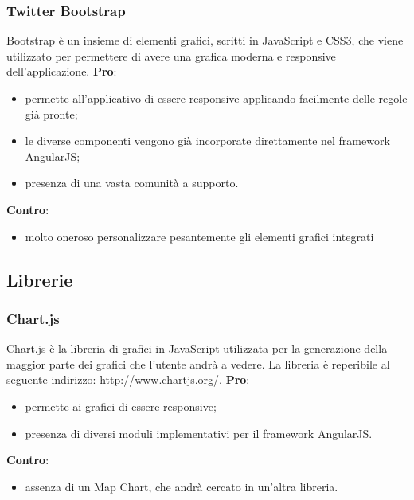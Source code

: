 		\subsubsection{Twitter Bootstrap} %
		\label{ssub:twitter_bootstrap}
		Bootstrap è un insieme di elementi grafici, scritti in JavaScript e CSS3, che viene utilizzato per permettere di avere una grafica moderna e responsive dell'applicazione. \newline
		\textbf{Pro}:
			\begin{itemize}
				\item permette all'applicativo di essere responsive applicando facilmente delle regole già pronte;
				\item le diverse componenti vengono già incorporate direttamente nel framework AngularJS;
				\item presenza di una vasta comunità a supporto.
			\end{itemize}
		\noindent
		\textbf{Contro}:
			\begin{itemize}
				\item molto oneroso personalizzare pesantemente gli elementi grafici integrati
			\end{itemize}


	\subsection{Librerie} %
	\label{sub:librerie}
		\subsubsection{Chart.js} %
		\label{ssub:chartsjs}
		Chart.js è la libreria di grafici in JavaScript utilizzata per la generazione della maggior parte dei grafici che l'utente andrà a vedere. La libreria è reperibile al seguente indirizzo: \url{http://www.chartjs.org/}. \newline
		\textbf{Pro}:
			\begin{itemize}
				\item permette ai grafici di essere responsive;
				\item presenza di diversi moduli implementativi per il framework AngularJS.
			\end{itemize}
		\noindent
		\textbf{Contro}:
			\begin{itemize}
				\item assenza di un Map Chart, che andrà cercato in un'altra libreria.
			\end{itemize}

